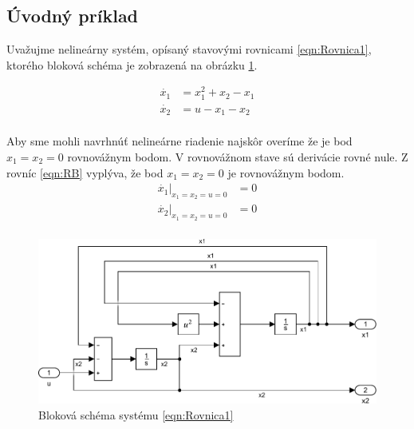 \documentclass[../main.tex]{subfiles}
\begin{document}
	
\subsection{Úvodný príklad}
Uvažujme nelineárny systém, opísaný stavovými rovnicami \ref{eqn:Rovnica1}, ktorého bloková schéma je zobrazená na obrázku \ref{fig:BlokovaSchemaPr1}. 

\begin{equation}
	\begin{aligned}
	\dot{x_1} &= x_1^2 + x_2 - x_1 \\
	\dot{x_2} &= u - x_1 - x_2 \\
	\end{aligned}
	\label{eqn:Rovnica1}
\end{equation}

Aby sme mohli navrhnúť nelineárne riadenie najskôr overíme že je bod  $x_1 = x_2 = 0$ rovnovážnym bodom. V rovnovážnom stave sú derivácie rovné nule. Z rovníc \ref{eqn:RB} vyplýva, že bod $x_1 = x_2 = 0$ je rovnovážnym bodom.
\begin{equation}
\begin{aligned}
    \dot{x_1}|_{x_1 = x_2 = u = 0} &=  0 \\
\dot{x_2}|_{x_1 = x_2 = u = 0} &= 0 \\
\end{aligned}
\label{eqn:RB}
\end{equation}
\begin{figure}[H]
	\begin{center}\includegraphics[scale=0.8]{Rovnica1.pdf}\end{center}
	\caption{Bloková schéma systému \ref{eqn:Rovnica1}}
	\label{fig:BlokovaSchemaPr1}
\end{figure}
\end{document}

